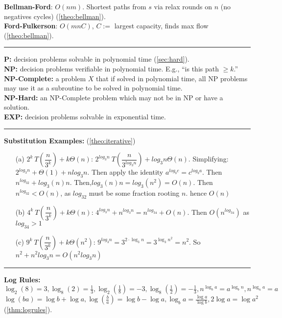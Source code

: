 \textbf{Bellman-Ford}: $O(nm)$. Shortest paths from $s$ via relax rounds on $n$ (no negatives cycles) (\ref{theo:bellman}).\\
\textbf{Ford-Fulkerson}: $O(mnC)$, $C:=$ largest capacity, finds max flow (\ref{theo:bellman}).\\
\noindent\rule{\textwidth}{0.4pt}
\textbf{P:} decision problems solvable in polynomial time (\ref{sec:hard}).\\
\textbf{NP:} decision problems verifiable in polynomial time. E.g., ``is this path $\geq k$.''\\
\textbf{NP-Complete:} a problem $X$ that if solved in polynomial time, all NP problems may use it as a subroutine to be solved in polynomial time.\\
\textbf{NP-Hard:} an NP-Complete problem which may not be in NP or have a solution.\\
\textbf{EXP:} decision problems solvable in exponential time.\\
\noindent\rule{\textwidth}{0.4pt}
\textbf{Substitution Examples:} (\ref{theo:iterative})

\vspace{-.5em}
\begin{itemize}
    \item[(a)] $2^{k}\ T \left(\dfrac{n}{3^k} \right)+k \Theta(n)$: $2^{log_3n}\ T \left(\dfrac{n}{3^{log_3n}} \right)+log_3n \Theta(n)$.
    Simplifying: $2^{log_3n}+\Theta(1)+nlog_3n$. Then apply the identity $a^{log_bc}=c^{log_ba}$.
    Then $n^{log_32}+log_3(n)n$. Then,$log_3(n)n=log_3(n^2)=O(n)$.
    Then $n^{log_32}<O(n)$, as $log_32$ must be some fraction rooting $n$. hence $O(n)$

    \item[(b)] $4^{k}\ T \left(\dfrac{n}{3^k} \right)+k \Theta(n)$: $4^{log_3n}+n^{log_3n}=n^{log_34}+O(n)$. Then $O(n^{log_34})$ as $log_34>1$
    \item[(c)]  $9^{k}\ T \left(\dfrac{n}{3^k} \right)+k \Theta(n^2)$: $9^{log_3n}=3^{2\cdot\log_3n}=3^{\log_3n^2}=n^2$.
    So $n^2+n^2log_3n = O(n^2log_3n) $
\end{itemize}
\noindent\rule{\textwidth}{0.4pt}
\textbf{Log Rules:} $\log_2(8)=3,\log_8(2)=\frac{1}{3},\log_2(\frac{1}{8})=-3, \log_8(\frac{1}{2})=-\frac{1}{3},n^{\log_ba}=a^{\log_bn},n^{\log_na}=a$\\

\vspace{-1em}
\noindent
$\log(ba)=\log b+\log a,\log(\frac{b}{a})=\log b-\log a,\log_ba=\frac{\log a}{\log b},2\log a= \log a^2$ (\ref{thm:logrules}).

